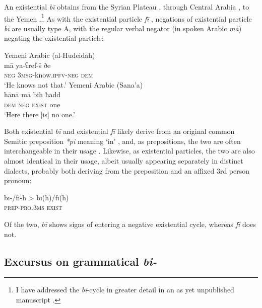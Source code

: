 \documentclass[output=paper]{langsci/langscibook}
\begin{document}
An existential \textit{bī} obtains from the Syrian Plateau \citep[346–348, map 336]{behnstedt1997a}, through Central Arabia \citep[44--45]{ingham1994a}, to the Yemen \citep[346, map 136]{behnstedt2016a}.\footnote{I have addressed the \textit{bī}-cycle in greater detail in an as yet unpublished manuscript \citet{wilmsen2020b}.} As with the existential particle \textit{fī} \citep[7]{Croft1991}, negations of existential particle \textit{bī} are usually type A, with the regular verbal negator (in spoken Arabic \textit{mā}) negating the existential particle:

\ea \label{ex:WiAR-22}
  \ea Yemeni Arabic (al-Hudeidah)\\
  	\gll mā ya-ʕref-š ðe\\
  	\textsc{neg} \textsc{3msg}-know.\textsc{ipfv-neg} \textsc{dem}\\
  	\glt ‘He knows not that.’ \citep[210]{simeone-senelle1996a}	
  \ex Yemeni Arabic (Sana’a)\\
  	\gll hānā mā bih ħadd\\
  	\textsc{dem} \textsc{neg} \textsc{exist} one\\
  	\glt ‘Here there [is] no one.’ \citep[163]{watson1993a}
\z \z

Both existential \textit{bī} and existential \textit{fī} likely derive from an original common Semitic preposition \textit{*pi} meaning ‘in’ \citep[470]{lipi2001a}, and, as prepositions, the two are often interchangeable in their usage \citep[479]{cowell2005a}. Likewise, as existential particles, the two are also almost identical in their usage, albeit usually appearing separately in distinct dialects, probably both deriving from the preposition and an affixed 3rd person pronoun:

\ea \label{ex:WiAR-23}
	\gll bī-/fī-h > bī(h)/fī(h)\\
	\textsc{prep-pro.3ms} {} \textsc{exist}\\
	\glt
\z

Of the two, \textit{bī} shows signs of entering a negative existential cycle, whereas \textit{fī} does not.

\subsection{Excursus on grammatical \textit{bi-}} \label{s:WiAR-4.1}
\end{document}
